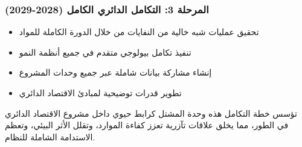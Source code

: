 \subsubsection{المرحلة 3: التكامل الدائري الكامل (2028-2029)}
\begin{itemize}
    \item تحقيق عمليات شبه خالية من النفايات من خلال الدورة الكاملة للمواد
    \item تنفيذ تكامل بيولوجي متقدم في جميع أنظمة النمو
    \item إنشاء مشاركة بيانات شاملة عبر جميع وحدات المشروع
    \item تطوير قدرات توضيحية لمبادئ الاقتصاد الدائري
\end{itemize}

تؤسس خطة التكامل هذه وحدة المشتل كرابط حيوي داخل مشروع الاقتصاد الدائري في الطور، مما يخلق علاقات تآزرية تعزز كفاءة الموارد، وتقلل الأثر البيئي، وتعظم الاستدامة الشاملة للنظام. 